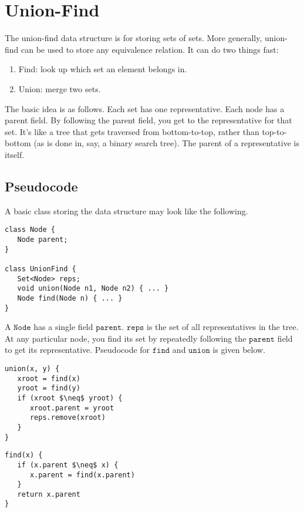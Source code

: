 \documentclass[a4paper,12pt]{article}
\newcommand{\kwa}[1]{\mathtt{#1}}
\begin{document}
\section{Union-Find}

The union-find data structure is for storing sets of sets. More generally, union-find can be used to store any equivalence relation. It can do two things fast:

\begin{enumerate}
	\item Find: look up which set an element belongs in.
	\item Union: merge two sets.
\end{enumerate}

\noindent
The basic idea is as follows. Each set has one representative. Each node has a parent field. By following the parent field, you get to the representative for that set. It's like a tree that gets traversed from bottom-to-top, rather than top-to-bottom (as is done in, say, a binary search tree). The parent of a representative is itself.

\subsection{Pseudocode}

A basic class storing the data structure may look like the following.

\begin{lstlisting}
class Node {
   Node parent;
}

class UnionFind {
   Set<Node> reps;
   void union(Node n1, Node n2) { ... }
   Node find(Node n) { ... }
}
\end{lstlisting}

\noindent
A $\kwa{Node}$ has a single field $\kwa{parent}$. $\kwa{reps}$ is the set of all representatives in the tree. At any particular node, you find its set by repeatedly following the $\kwa{parent}$ field to get its representative. Pseudocode for $\kwa{find}$ and $\kwa{union}$ is given below.

\begin{lstlisting}
union(x, y) {
   xroot = find(x)
   yroot = find(y)
   if (xroot $\neq$ yroot) {
      xroot.parent = yroot
      reps.remove(xroot)
   }
}
\end{lstlisting}

\begin{lstlisting}
find(x) {
   if (x.parent $\neq$ x) {
      x.parent = find(x.parent)
   }
   return x.parent
}
\end{lstlisting}
\end{document}

